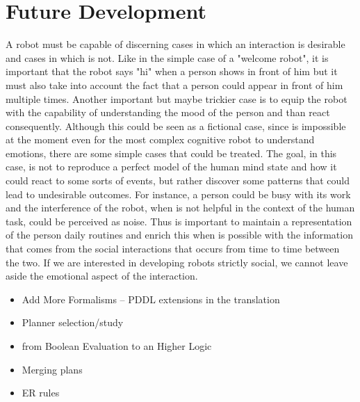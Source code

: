 \documentclass[pdftex,12pt,a4paper]{report}
\begin{document}
\section{Future Development}
A robot must be capable of discerning cases in which an interaction is desirable and cases in which is not. Like in the simple case of a "welcome robot", it is important that the robot says "hi" when a person shows in front of him but it must also take into account the fact that a person could appear in front of him multiple times. 
Another important but maybe trickier case is to equip the robot with the capability of understanding the mood of the person and than react consequently. Although this could be seen as a fictional case, since is impossible at the moment even for the most complex cognitive robot to understand emotions, there are some simple cases that could be treated. The goal, in this case, is not to reproduce a perfect model of the human mind state and how it could react to some sorts of events, but rather discover some patterns that could lead to undesirable outcomes. For instance, a person could be busy with its work and the interference of the robot, when is not helpful in the context of the human task, could be perceived as noise. Thus is important to maintain a representation of the person daily routines and enrich this when is possible with the information that comes from the social interactions that occurs from time to time between the two. If we are interested in developing robots strictly social, we cannot leave aside the emotional aspect of the interaction. 


\begin{itemize}
\item Add More Formalisms -- PDDL extensions in the translation
\item Planner selection/study
\item from Boolean Evaluation to an Higher Logic
\item Merging plans
\item ER rules
\end{itemize}




\end{document}
